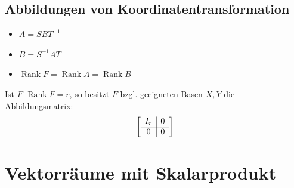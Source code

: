 \documentclass[a4paper,10pt]{article}
\DeclareMathOperator{\Rank}{Rank}
\def\E{\mathbb{E}}
\begin{document}
\subsection{Abbildungen von Koordinatentransformation}

\begin{subbox}{}
  \begin{multicols}{2}
    \begin{itemize}
      \item $A = SBT^{-1}$
      \item $B = S^{-1}AT$
      \item $\Rank F = \Rank A = \Rank B$
    \end{itemize}
  \end{multicols}
\end{subbox}

Ist $F$ $\Rank F = r$, so besitzt $F$ bzgl. geeigneten Basen $X, Y$ die Abbildungsmatrix: 
\[
  \left[\begin{array}{ c | c }
    I_r & 0 \\
    \hline
    0 & 0
  \end{array}\right]
\]

\section{Vektorräume mit Skalarprodukt}
\end{document}
